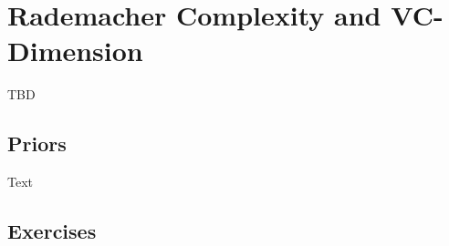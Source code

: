 \chapter{Rademacher Complexity and VC-Dimension}
\begin{flushleft}
	TBD
	\section{Priors}
	Text
	
	\section{Exercises}
	
	\\
	
\end{flushleft}
